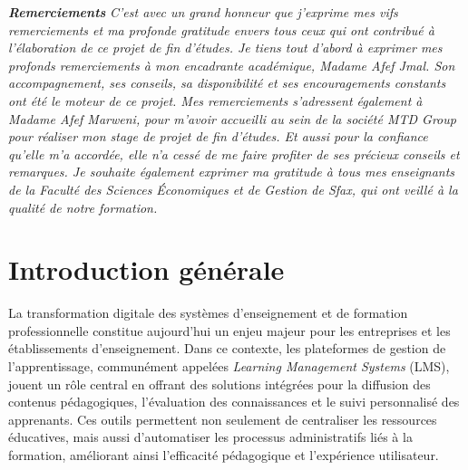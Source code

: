 \documentclass[12pt,a4paper]{report}
\begin{document}
\clearpage
{}
\begin{center}
    \vspace*{1.5cm}
    {\Huge\color{fsegsblue}\textbf{\textit{Remerciements}}}
    \vspace{1.5cm}
    \large\itshape
    C'est avec un grand honneur que j'exprime mes vifs remerciements et ma profonde gratitude envers tous ceux qui ont contribué à l'élaboration de ce projet de fin d'études.
    \vspace{1cm}
    Je tiens tout d'abord à exprimer mes profonds remerciements à mon encadrante académique, Madame Afef Jmal. Son accompagnement, ses conseils, sa disponibilité et ses encouragements constants ont été le moteur de ce projet.
    \vspace{1cm}
    Mes remerciements s'adressent également à Madame Afef Marweni, pour m'avoir accueilli au sein de la société MTD Group pour réaliser mon stage de projet de fin d'études. Et aussi pour la confiance qu'elle m'a accordée, elle n'a cessé de me faire profiter de ses précieux conseils et remarques.
    \vspace{1cm}
    Je souhaite également exprimer ma gratitude à tous mes enseignants de la Faculté des Sciences Économiques et de Gestion de Sfax, qui ont veillé à la qualité de notre formation.
\end{center}
\clearpage

\renewcommand{\contentsname}{Sommaire}
\tableofcontents
\clearpage
\renewcommand{\listfigurename}{Table des Figures}
\listoffigures
{}
\clearpage
\renewcommand{\listtablename}{Liste des Tableaux}
\listoftables
{}
\clearpage

\clearpage
\chapter*{Introduction générale}
\clearpage
La transformation digitale des systèmes d'enseignement et de formation professionnelle constitue aujourd'hui un enjeu majeur pour les entreprises et les établissements d'enseignement. Dans ce contexte, les plateformes de gestion de l'apprentissage, communément appelées \textit{Learning Management Systems} (LMS), jouent un rôle central en offrant des solutions intégrées pour la diffusion des contenus pédagogiques, l'évaluation des connaissances et le suivi personnalisé des apprenants. Ces outils permettent non seulement de centraliser les ressources éducatives, mais aussi d'automatiser les processus administratifs liés à la formation, améliorant ainsi l'efficacité pédagogique et l'expérience utilisateur.
\end{document}
